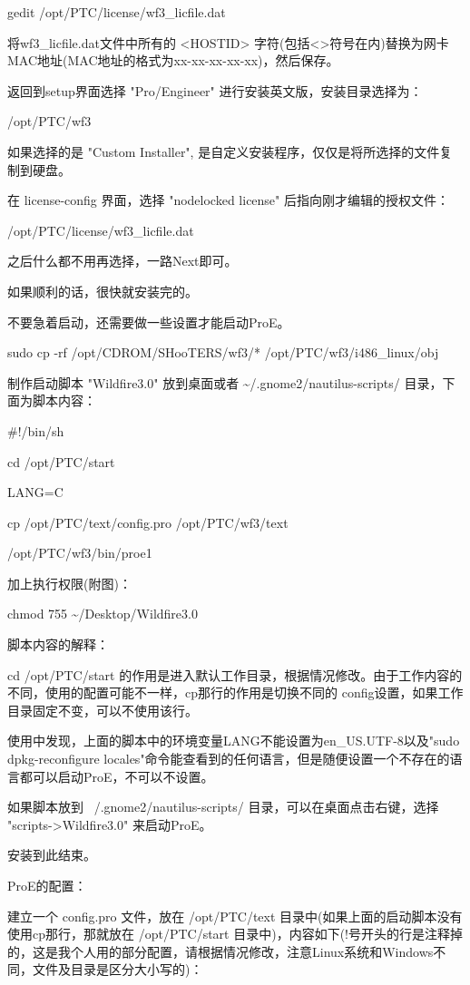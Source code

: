 gedit /opt/PTC/license/wf3\_licfile.dat

将wf3\_licfile.dat文件中所有的 <HOSTID> 字符(包括<>符号在内)替换为网卡MAC地址(MAC地址的格式为xx-xx-xx-xx-xx)，然后保存。

返回到setup界面选择 "Pro/Engineer" 进行安装英文版，安装目录选择为：

/opt/PTC/wf3

如果选择的是 "Custom Installer", 是自定义安装程序，仅仅是将所选择的文件复制到硬盘。

在 license-config 界面，选择 "nodelocked license" 后指向刚才编辑的授权文件：

/opt/PTC/license/wf3\_licfile.dat

之后什么都不用再选择，一路Next即可。

如果顺利的话，很快就安装完的。

不要急着启动，还需要做一些设置才能启动ProE。

sudo cp -rf /opt/CDROM/SHooTERS/wf3/* /opt/PTC/wf3/i486\_linux/obj

制作启动脚本 "Wildfire3.0" 放到桌面或者 \~{}/.gnome2/nautilus-scripts/ 目录，下面为脚本内容：

\#!/bin/sh

cd /opt/PTC/start

LANG=C

cp /opt/PTC/text/config.pro /opt/PTC/wf3/text

/opt/PTC/wf3/bin/proe1

加上执行权限(附图)：

chmod 755 \~{}/Desktop/Wildfire3.0

脚本内容的解释：

cd /opt/PTC/start 的作用是进入默认工作目录，根据情况修改。由于工作内容的不同，使用的配置可能不一样，cp那行的作用是切换不同的
config设置，如果工作目录固定不变，可以不使用该行。

使用中发现，上面的脚本中的环境变量LANG不能设置为en\_US.UTF-8以及"sudo dpkg-reconfigure locales"命令能查看到的任何语言，但是随便设置一个不存在的语言都可以启动ProE，不可以不设置。

如果脚本放到 ~{}/.gnome2/nautilus-scripts/ 目录，可以在桌面点击右键，选择 "scripts->Wildfire3.0" 来启动ProE。

安装到此结束。

ProE的配置：

建立一个 config.pro 文件，放在 /opt/PTC/text 目录中(如果上面的启动脚本没有使用cp那行，那就放在 /opt/PTC/start 目录中)，内容如下(!号开头的行是注释掉的，这是我个人用的部分配置，请根据情况修改，注意Linux系统和Windows不同，文件及目录是区分大小写的)：

